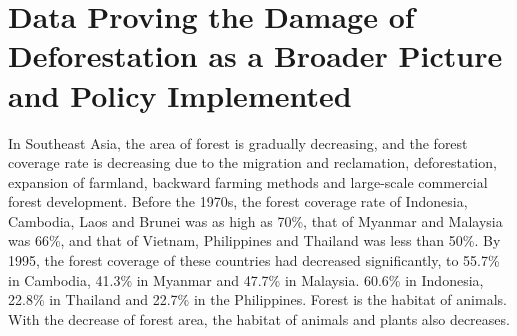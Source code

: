 \documentclass{book}\usepackage{knitr}
\begin{document}
{\section{Data Proving the Damage of Deforestation as a Broader Picture and Policy Implemented}
In Southeast Asia, the area of forest is gradually decreasing, and the forest coverage rate is decreasing due to the migration and reclamation, deforestation, expansion of farmland, backward farming methods and large-scale commercial forest development. Before the 1970s, the forest coverage rate of Indonesia, Cambodia, Laos and Brunei was as high as 70\%, that of Myanmar and Malaysia was 66\%, and that of Vietnam, Philippines and Thailand was less than 50\%. By 1995, the forest coverage of these countries had decreased significantly, to 55.7\% in Cambodia, 41.3\% in Myanmar and 47.7\% in Malaysia. 60.6\% in Indonesia, 22.8\% in Thailand and 22.7\% in the Philippines. Forest is the habitat of animals. With the decrease of forest area, the habitat of animals and plants also decreases.
}
\end{document}
